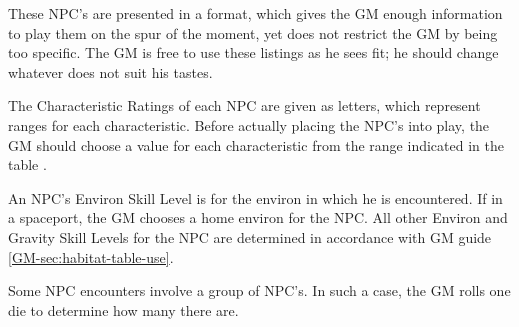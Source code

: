 These NPC's are presented in a format, which gives the GM enough
information to play them on the spur of the moment, yet does not
restrict the GM by being too specific. The GM is free to use these
listings as he sees fit; he should change whatever does not suit his
tastes.

The Characteristic Ratings of each NPC are given as letters, which
represent ranges for each characteristic. Before actually placing the
NPC's into play, the GM should choose a value for each characteristic
from the range indicated in the table .


\begin{table}[htbp]
  \centering
\end{table}

An NPC's Environ Skill Level is for the environ in which he is
encountered. If in a spaceport, the GM chooses a home environ for the
NPC. All other Environ and Gravity Skill Levels for the NPC are
determined in accordance with GM guide \ref{GM-sec:habitat-table-use}.

Some NPC encounters involve a group of NPC's. In such a case, the GM
rolls one die to determine how many there are.

\newenvironment{npc}[3]{%
\refstepcounter{npc}\paragraph{NPC Nr. #1\thenpc:}

#2\\
\emph{#3}\\
}{%

\bigskip

}

